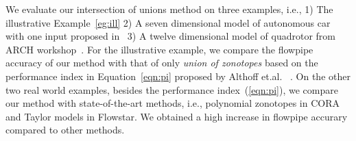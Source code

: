 We evaluate our intersection of unions method on three examples, i.e.,
1) The illustrative Example~\ref{eg:ill} 2) A seven dimensional model
of autonomous car with one input proposed in~ 3) A twelve dimensional
model of quadrotor from ARCH workshop~.  For the illustrative example,
we compare the flowpipe accuracy of our method with that of only
\emph{union of zonotopes} based on the performance index in
Equation~\ref{eqn:pi} proposed by Althoff
et.al.~\cite{althoff2008reachability} .  On the other two real world
examples, besides the performance index~(\ref{eqn:pi}), we compare our
method with state-of-the-art methods, i.e., polynomial
zonotopes in CORA and Taylor models in Flowstar.  We obtained a high
increase in flowpipe accurary compared to other methods.
%

